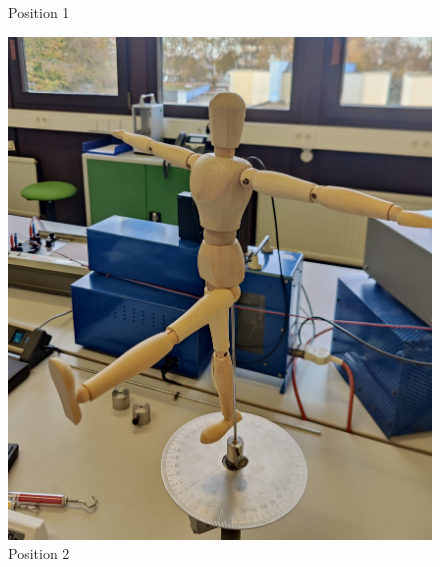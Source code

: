 \begin{figure}[h]
\begin{minipage}{0.45\textwidth}
        \caption{Position 1}
    \end{minipage}
    \hfill
    \begin{minipage}{0.45\textwidth}
        \centering
        \includegraphics[width=\textwidth]{Bilder/abb4.jpg}
        \caption{Position 2}
    \end{minipage}
\end{figure}